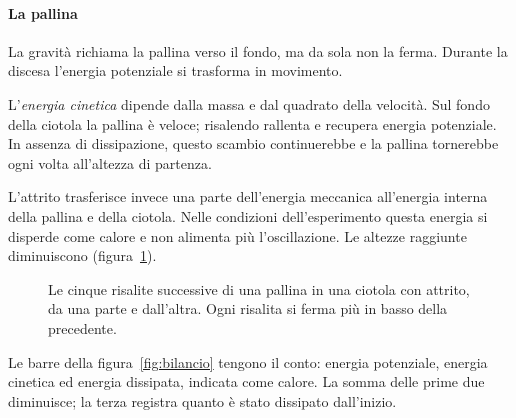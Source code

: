 \documentclass[11pt,a4paper,twoside=false,headinclude,footinclude]{scrartcl}
\begin{document}
\paragraph{La pallina} La gravità richiama la pallina verso il fondo, ma da sola non la ferma. Durante la discesa l'energia potenziale si trasforma in movimento.

L'\emph{energia cinetica} dipende dalla massa e dal quadrato della velocità. Sul fondo della ciotola la pallina è veloce; risalendo rallenta e recupera energia potenziale. In assenza di dissipazione, questo scambio continuerebbe e la pallina tornerebbe ogni volta all'altezza di partenza.

L'attrito trasferisce invece una parte dell'energia meccanica all'energia interna della pallina e della ciotola. Nelle condizioni dell'esperimento questa energia si disperde come calore e non alimenta più l'oscillazione. Le altezze raggiunte diminuiscono (figura~\ref{fig:quote}).

\begin{figure}[htbp]
\centering
{}
\caption{Le cinque risalite successive di una pallina in una ciotola con attrito, da una parte e dall'altra. Ogni risalita si ferma più in basso della precedente.}
\label{fig:quote}
\end{figure}

Le barre della figura~\ref{fig:bilancio} tengono il conto: energia potenziale, energia cinetica ed energia dissipata, indicata come calore. La somma delle prime due diminuisce; la terza registra quanto è stato dissipato dall'inizio.
\end{document}
